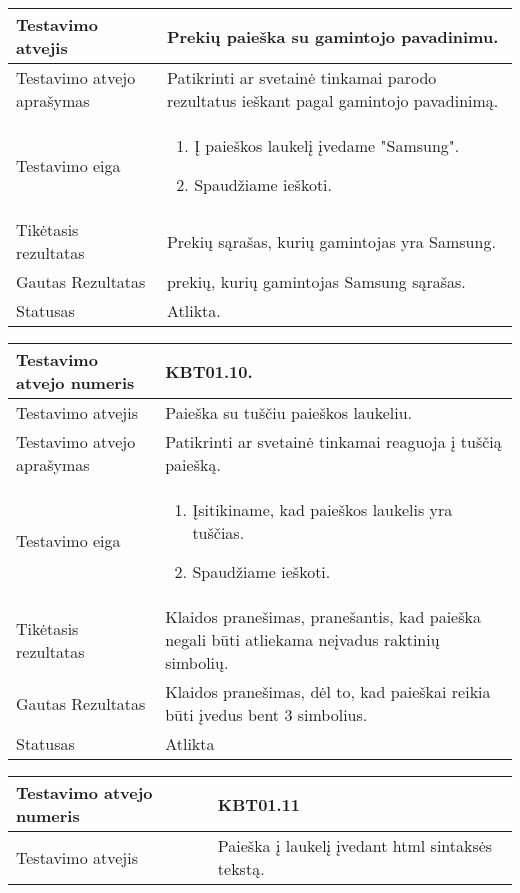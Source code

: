 \documentclass{VUMIFPSkursinis}
\begin{document}
\begin{center}
\begin{tabular}{ |p{5cm}|p{10cm}|}
	Testavimo atvejis & Prekių paieška su gamintojo pavadinimu. \\ \hline
	Testavimo atvejo aprašymas & Patikrinti ar svetainė tinkamai parodo rezultatus ieškant pagal gamintojo pavadinimą.\\ \hline
	Testavimo eiga & 
	\begin{enumerate}
	\item Į paieškos laukelį įvedame "Samsung".
	\item Spaudžiame ieškoti.
\end{enumerate} \\ \hline
	Tikėtasis rezultatas & Prekių sąrašas, kurių gamintojas yra Samsung. \\ \hline
	Gautas Rezultatas & prekių, kurių gamintojas Samsung sąrašas.\\ \hline
	Statusas & Atlikta. \\ \hline
	\end{tabular}
\vspace{1cm}
\begin{tabular}{ |p{5cm}|p{10cm}|}
	\hline
	Testavimo atvejo numeris & KBT01.10. \\ \hline
	Testavimo atvejis & Paieška su tuščiu paieškos laukeliu. \\ \hline
	Testavimo atvejo aprašymas & Patikrinti ar svetainė tinkamai reaguoja į tuščią paiešką. \\ \hline
	Testavimo eiga &
	\begin{enumerate}
	\item Įsitikiname, kad paieškos laukelis yra tuščias.
	\item Spaudžiame ieškoti.
	\end{enumerate} \\ \hline
	Tikėtasis rezultatas & Klaidos pranešimas, pranešantis, kad paieška negali būti atliekama neįvadus raktinių simbolių. \\ \hline
	Gautas Rezultatas & Klaidos pranešimas, dėl to, kad paieškai reikia būti įvedus bent 3 simbolius. \\ \hline
	Statusas & Atlikta \\ \hline
	\end{tabular}
\vspace{1cm}
\begin{tabular}{ |p{5cm}|p{10cm}|}
	\hline
	Testavimo atvejo numeris & KBT01.11 \\ \hline
	Testavimo atvejis & Paieška į laukelį įvedant html sintaksės tekstą. \\ \hline

\end{tabular}
\end{center}
\end{document}
